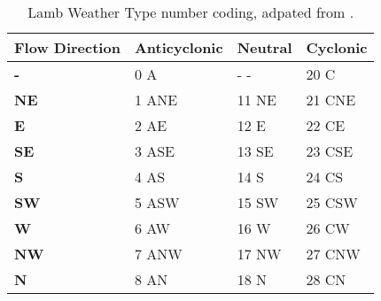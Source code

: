 \documentclass[10pt]{article}
\begin{document}


\begin{table}[h]
  \begin{center}
    \begin{tabular}{llll}
    \rowcolor{gray!50}
      \toprule
	{Flow Direction} & \textbf{Anticyclonic} & \textbf{Neutral} & \textbf{Cyclonic} \\
	\midrule
      \textbf{-} & 0  A & - - & 20  C \\
      \textbf{NE} & 1  ANE & 11  NE & 21  CNE \\
      \textbf{E} & 2  AE & 12  E & 22  CE \\
      \textbf{SE} & 3  ASE & 13  SE & 23  CSE \\
      \textbf{S} & 4  AS & 14  S & 24  CS \\
      \textbf{SW} & 5  ASW & 15  SW & 25  CSW \\
      \textbf{W} & 6  AW & 16  W & 26  CW \\
      \textbf{NW} & 7  ANW & 17  NW & 27  CNW \\
      \textbf{N} & 8  AN & 18  N & 28  CN \\
      \bottomrule
    \end{tabular}
    \caption{Lamb Weather Type number coding, adpated from \cite{Lamb1972}.}
    \label{table:LWT}
  \end{center}
\end{table}
\end{document}

